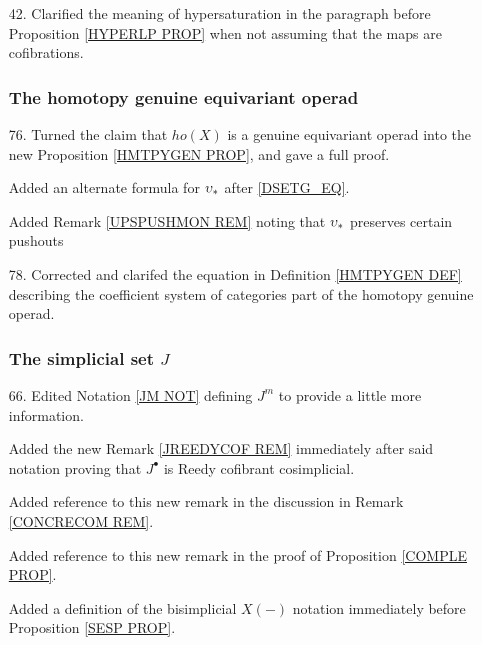 \documentclass{article}
\begin{document}
\begin{itemize}
\item[42.] Clarified the meaning of hypersaturation in the paragraph before Proposition \ref{HYPERLP PROP} when not assuming that the maps are cofibrations. %

      

          
      \subsubsection*{The homotopy genuine equivariant operad}
\item[76.] Turned the claim that $ho(X)$ is a genuine equivariant operad into the new Proposition \ref{HMTPYGEN PROP}, and gave a full proof.
      
      
      Added an alternate formula for $\upsilon_{\**}$ after \eqref{DSETG_EQ}.
      
      Added Remark \ref{UPSPUSHMON REM} noting that $\upsilon_{\**}$ preserves certain pushouts %
      
      
\item[78.] Corrected and clarifed the equation in Definition \ref{HMTPYGEN DEF} describing the coefficient system of categories part of the homotopy genuine operad. %



      
      \subsubsection*{The simplicial set $J$}
\item[66.] Edited Notation \ref{JM NOT} defining $J^m$ to provide a little more information.

Added the new Remark \ref{JREEDYCOF REM} immediately after said notation proving that $J^{\bullet}$ is Reedy cofibrant cosimplicial.

Added reference to this new remark in the discussion in Remark \ref{CONCRECOM REM}.

Added reference to this new remark in the proof of Proposition \ref{COMPLE PROP}.

Added a definition of the bisimplicial $X(-)$ notation immediately before Proposition \ref{SESP PROP}.


\end{itemize}
\end{document}
